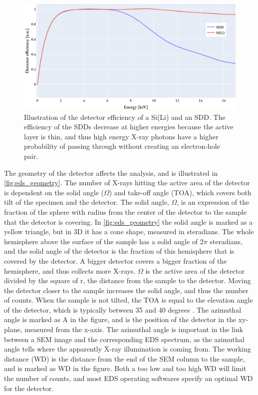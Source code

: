 \begin{figure}[pht]
    \centering
    \includegraphics[width=0.65\linewidth]{figures/detector_efficiency_illustration.png}
    \caption{
        Illustration of the detector efficiency of a Si(Li) and an SDD.
        The efficiency of the SDDs decrease at higher energies because the active layer is thin, and thus high energy X-ray photons have a higher probability of passing through without creating an electron-hole pair.
    }
    \label{fig:detector_efficiency}
\end{figure}




The geometry of the detector affects the analysis, and is illustrated in \cref{fig:eds_geometry}.
The number of X-rays hitting the active area of the detector is dependent on the solid angle ($\Omega$) and take-off angle (TOA), which covers both tilt of the specimen and the detector.
The solid angle, $\Omega$, is an expression of the fraction of the sphere with radius from the center of the detector to the sample that the detector is covering.
In \cref{fig:eds_geometry} the solid angle is marked as a yellow triangle, but in 3D it has a cone shape, measured in steradians.
The whole hemisphere above the surface of the sample has a solid angle of 2$\pi$ steradians, and the solid angle of the detector is the fraction of this hemisphere that is covered by the detector.
A bigger detector covers a bigger fraction of the hemisphere, and thus collects more X-rays.
$\Omega$ is the active area of the detector divided by the square of r, the distance from the sample to the detector.
Moving the detector closer to the sample increases the solid angle, and thus the number of counts.
When the sample is not tilted, the TOA is equal to the elevation angle of the detector, which is typically between 35 and 40 degrees \cite{dtsaii_1_getting_started}.
The azimuthal angle is marked as A in the figure, and is the position of the detector in the xy-plane, measured from the x-axis.
The azimuthal angle is important in the link between a SEM image and the corresponding EDS spectrum, as the azimuthal angle tells where the apparently X-ray illumination is coming from.
The working distance (WD) is the distance from the end of the SEM column to the sample, and is marked as WD in the figure.
Both a too low and too high WD will limit the number of counts, and most EDS operating softwares specify an optimal WD for the detector.




